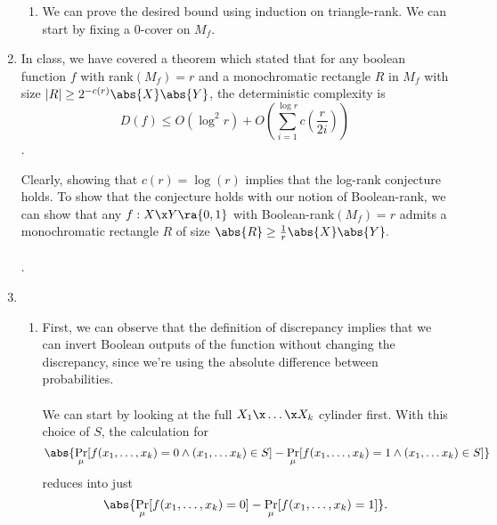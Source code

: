 \documentclass{article}
\begin{document}
\begin{enumerate}
\begin{enumerate}
        \item We can prove the desired bound using induction on triangle-rank.
            We can start by fixing a 0-cover on $M_f$.

    \end{enumerate}

    \item In class, we have covered a theorem which stated that for any boolean
        function $f$ with rank$(M_f) = r$ and a monochromatic rectangle $R$ in 
        $M_f$ with size $|R| \geq 2^{-c(r)} \abs{X}\abs{Y}$, the deterministic
        complexity is $$D(f) \leq O(\log^2 r) + O \left(\sum^{\log r}_{i=1}
        c(\frac{r}{2i}) \right)$$.

        Clearly, showing that $c(r) = \log(r)$ implies that the log-rank 
        conjecture holds. To show that the conjecture holds with our notion of
        Boolean-rank, we can show that any $f: X \x Y \ra \{0, 1\}$ with 
        Boolean-rank$(M_f) = r$ admits a monochromatic rectangle $R$ of size
        $\abs{R} \geq \frac{1}{r} \abs{X} \abs{Y}.$
        \\\\
        .

    \item 
    \begin{enumerate}
        \item First, we can observe that the definition of discrepancy implies
            that we can invert Boolean outputs of the function without changing
            the discrepancy, since we're using the absolute difference between
            probabilities.
            \\\\
            We can start by looking at the full $X_1 \x \ldots \x X_k$ cylinder
            first. With this choice of $S$, the calculation for
            $$\abs{\Pr_\mu[f(x_1, \ldots, x_k) = 0 \land (x_1, \ldots x_k) \in
            S] - \Pr_\mu[f(x_1, \ldots, x_k) = 1 \land (x_1, \ldots x_k) \in S]
            }$$
            reduces into just
            $$\abs{ \Pr_\mu[f(x_1, \ldots, x_k) = 0] - \Pr_\mu[f(x_1, \ldots,
            x_k) = 1] }.$$


\end{enumerate}
\end{enumerate}
\end{document}
